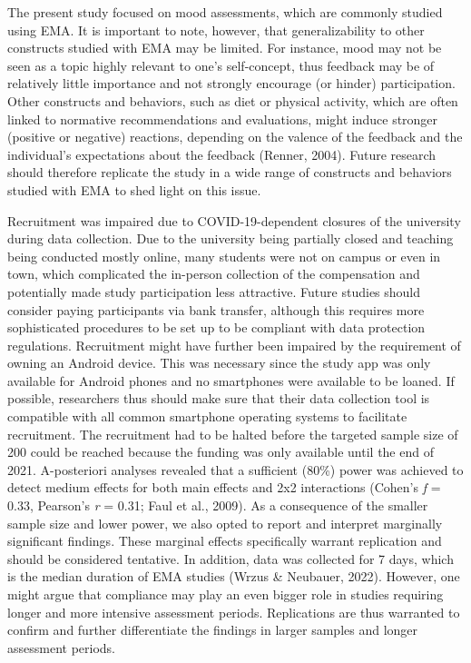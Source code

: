 \documentclass[authordate, empirical,issue]{jote-new-article}
\begin{document}
The present study focused on mood assessments, which are commonly studied using EMA. It is important to note, however, that generalizability to other constructs studied with EMA may be limited. For instance, mood may not be seen as a topic highly relevant to one's self-concept, thus feedback may be of relatively little importance and not strongly encourage (or hinder) participation. Other constructs and behaviors, such as diet or physical activity, which are often linked to normative recommendations and evaluations, might induce stronger (positive or negative) reactions, depending on the valence of the feedback and the individual's expectations about the feedback (Renner, 2004). Future research should therefore replicate the study in a wide range of constructs and behaviors studied with EMA to shed light on this issue.



Recruitment was impaired due to COVID-19-dependent closures of the university during data collection. Due to the university being partially closed and teaching being conducted mostly online, many students were not on campus or even in town, which complicated the in-person collection of the compensation and potentially made study participation less attractive. Future studies should consider paying participants via bank transfer, although this requires more sophisticated procedures to be set up to be compliant with data protection regulations. Recruitment might have further been impaired by the requirement of owning an Android device. This was necessary since the study app was only available for Android phones and no smartphones were available to be loaned. If possible, researchers thus should make sure that their data collection tool is compatible with all common smartphone operating systems to facilitate recruitment. The recruitment had to be halted before the targeted sample size of 200 could be reached because the funding was only available until the end of 2021. A-posteriori analyses revealed that a sufficient (80\%) power was achieved to detect medium effects for both main effects and 2x2 interactions (Cohen's \emph{f} = 0.33, Pearson's \emph{r} = 0.31; Faul et al., 2009). As a consequence of the smaller sample size and lower power, we also opted to report and interpret marginally significant findings. These marginal effects specifically warrant replication and should be considered tentative. In addition, data was collected for 7 days, which is the median duration of EMA studies (Wrzus \& Neubauer, 2022). However, one might argue that compliance may play an even bigger role in studies requiring longer and more intensive assessment periods. Replications are thus warranted to confirm and further differentiate the findings in larger samples and longer assessment periods.
\end{document}
